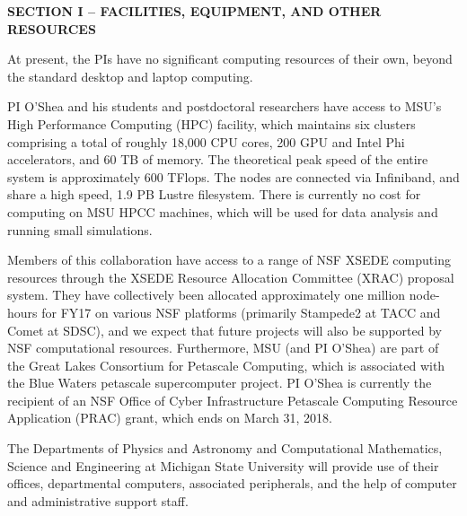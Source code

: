 \documentclass[11pt]{article}
\begin{document}
\vspace{-6mm}
\begin{center} 
\bfseries\uppercase{Section I -- Facilities, Equipment, and Other Resources }
\end{center}

At present, the PIs have no significant computing resources of their
own, beyond the standard desktop and laptop computing.

PI O'Shea and his students and postdoctoral researchers have access to
MSU's High Performance Computing (HPC) facility, which maintains six
clusters comprising a total of roughly 18,000 CPU cores, 200 GPU and
Intel Phi accelerators, and 60 TB of memory.  The theoretical peak
speed of the entire system is approximately 600 TFlops. The nodes are
connected via Infiniband, and share a high speed, 1.9 PB Lustre
filesystem.  There is currently no cost for computing on MSU HPCC
machines, which will be used for data analysis and running small
simulations.

Members of this collaboration have access to a range of NSF XSEDE
computing resources through the XSEDE Resource Allocation Committee
(XRAC) proposal system.  They have collectively been allocated
approximately one million node-hours for FY17 on various NSF
platforms (primarily Stampede2 at TACC and Comet at SDSC), and we
expect that future projects will also be supported by NSF
computational resources.  Furthermore, MSU (and PI O'Shea) are part of
the Great Lakes Consortium for Petascale Computing, which is
associated with the Blue Waters petascale supercomputer project.  PI
O’Shea is currently the recipient of an NSF Office of Cyber Infrastructure
Petascale Computing Resource Application (PRAC) grant, which ends on
March 31, 2018.

The Departments of Physics and Astronomy and Computational
Mathematics, Science and Engineering at Michigan State University
will provide use of their offices, departmental computers, associated
peripherals, and the help of computer and administrative support
staff.
\end{document}
